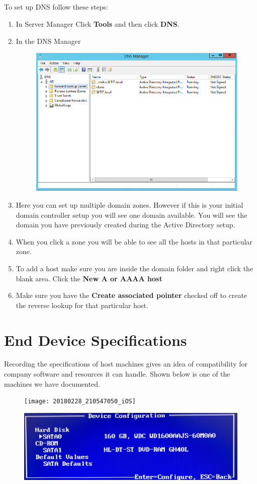 \documentclass{article}
\begin{document}
\subsection{}
To set up DNS follow these steps:
\begin{enumerate}
\item In Server Manager Click \textbf{Tools} and then click \textbf{DNS}.
\item In the DNS Manager 
\begin{figure}[h]
	\centering
	\includegraphics[width=0.6\linewidth]{dns/dns-install5}
\end{figure}
\item Here you can set up multiple domain zones. However if this is your initial domain controller setup you will see one domain available. You will see the domain you have previously created during the Active Directory setup.
\item When you click a zone you will be able to see all the hosts in that particular zone.
\item To add a host make sure you are inside the domain folder and right click the blank area. Click the \textbf{New A or AAAA host}
\item Make sure you have the \textbf{Create associated pointer} checked off to create the reverse lookup for that particular host.
\end{enumerate}
\newpage
\section{End Device Specifications}
Recording the specifications of host machines gives an idea of compatibility for company software and resources it can handle.
\newline \newline
Shown below is one of the machines we have documented.
\begin{figure}[h]
	\centering
	\texttt{[image: 20180228\_210547050\_iOS]}
\end{figure}
\begin{figure}
	\centering
	\includegraphics[width=1\linewidth]{"spec2 machine"}
\end{figure}
\newpage
\end{document}
